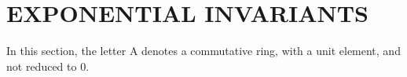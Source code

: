 \section{EXPONENTIAL INVARIANTS}

In this section, the letter A denotes a commutative ring, with a unit element, and not reduced to 0.

